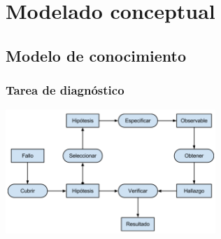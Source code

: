 \documentclass[a4paper,11pt]{article}
\begin{document}
	\section{Modelado conceptual}
		\subsection{Modelo de conocimiento}
			\subsubsection{Tarea de diagnóstico}
			\includegraphics[width=300px]{diagnostico.png} \\
\end{document}

